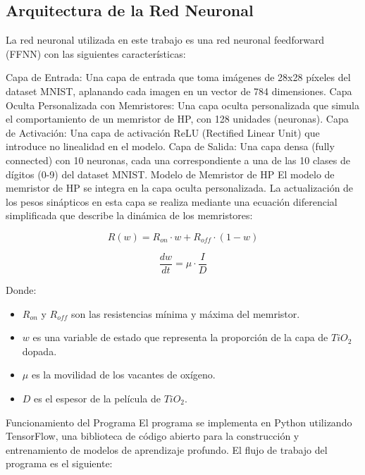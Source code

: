 \documentclass[conference]{IEEEtran}
\begin{document}
\subsection{Arquitectura de la Red Neuronal}
La red neuronal utilizada en este trabajo es una red neuronal feedforward (FFNN) con las siguientes características:

Capa de Entrada: Una capa de entrada que toma imágenes de 28x28 píxeles del dataset MNIST, aplanando cada imagen en un vector de 784 dimensiones.
Capa Oculta Personalizada con Memristores: Una capa oculta personalizada que simula el comportamiento de un memristor de HP, con 128 unidades (neuronas).
Capa de Activación: Una capa de activación ReLU (Rectified Linear Unit) que introduce no linealidad en el modelo.
Capa de Salida: Una capa densa (fully connected) con 10 neuronas, cada una correspondiente a una de las 10 clases de dígitos (0-9) del dataset MNIST.
Modelo de Memristor de HP
El modelo de memristor de HP se integra en la capa oculta personalizada. La actualización de los pesos sinápticos en esta capa se realiza mediante una ecuación diferencial simplificada que describe la dinámica de los memristores:

\begin{equation}
	R(w) = R_{on} \cdot w + R_{off} \cdot (1 - w)
	\label{eq:4}
\end{equation}

\begin{equation}
	\frac{dw}{dt} = \mu \cdot \frac{I}{D}
	\label{eq:5}
\end{equation}

Donde:
\begin{itemize}
	\item $R_{on}$ y $R_{off}$ son las resistencias mínima y máxima del memristor.
	\item $w$ es una variable de estado que representa la proporción de la capa de $TiO_{2}$ dopada.
	\item $\mu$ es la movilidad de los vacantes de oxígeno.
	\item $D$ es el espesor de la película de $TiO_{2}$.
\end{itemize}


Funcionamiento del Programa
El programa se implementa en Python utilizando TensorFlow, una biblioteca de código abierto para la construcción y entrenamiento de modelos de aprendizaje profundo. El flujo de trabajo del programa es el siguiente:
\end{document}
